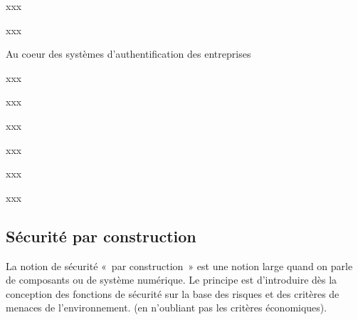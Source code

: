 \begin{nota}
xxx
\end{nota}

\begin{nota}[DMZ]
xxx
\end{nota}

\begin{nota}[Annuaire]
Au coeur des systèmes d’authentification des entreprises
\end{nota}


\begin{nota}[VPN]
xxx
\end{nota}


\begin{nota}[Signature]
xxx
\end{nota}

\begin{nota}
xxx
\end{nota}

\begin{nota}[Proxy]
xxx
\end{nota}
\begin{nota}[Routeur]
xxx
\end{nota}

\begin{nota}
xxx
\end{nota}


\subsection{Sécurité par construction}

La notion de sécurité « par construction » est une notion large quand on parle de composants ou de système numérique.
Le principe est d’introduire dès la conception des fonctions de sécurité sur la base des risques et des critères de menaces de l’environnement. (en n’oubliant pas les critères économiques).

